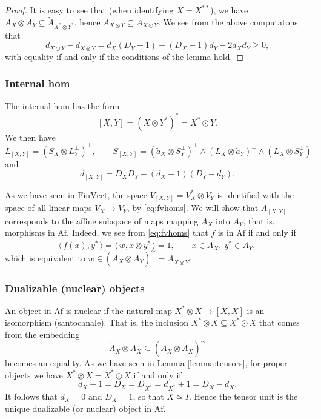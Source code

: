 \documentclass[12pt]{article}
\theoremstyle{definition}
\theoremstyle{remark}
\def\<{\langle\,}
\def\>{\,\rangle}
\def \Af{\mathrm{Af}}
\def \FV{\mathrm{FinVect}}
\begin{document}
\begin{proof} It is easy to see that (when identifying $X=X^{**}$), we have $A_X\otimes
A_Y\subseteq \tilde A_{X^*\otimes  Y^*}$, hence $A_{X\otimes Y}\subseteq A_{X\odot Y}$. We see from the above computatons that
\[
d_{X\odot Y}-d_{X\otimes Y}=d_X(D_Y-1)+(D_X-1)d_Y-2d_Xd_Y\ge 0,
\]
with equality if and only if the conditions of the lemma hold.

\end{proof}


\subsubsection{Internal hom}

The internal hom has the form
\begin{equation}\label{eq:ihom}
[X,Y]=(X\otimes Y^*)^*=X^*\odot Y.
\end{equation}
We then have 
\[
L_{[X,Y]}=(S_X\otimes L_Y^\perp)^\perp,\qquad S_{[X,Y]}=(\tilde a_X\otimes
S_Y^\perp)^\perp\wedge(L_X\otimes \tilde a_Y)^\perp\wedge (L_X\otimes
S_Y^\perp)^\perp
\]
and
\[
d_{[X,Y]}=D_XD_Y-(d_X+1)(D_Y-d_Y).
\]


As we have seen in $\FV$, the space $V_{[X,Y]}=V_X^*\otimes V_Y$ is identified with the
space of all linear maps $V_X\to V_Y$, by \eqref{eq:fvhoms}. We will show that $A_{[X,Y]}$ corresponds to the
affine subspace of maps mapping $A_X$ into $A_Y$, that is, morphisms in $\Af$. Indeed, we see from \eqref{eq:fvhoms}
that $f$ is in $\Af$ if and only if 
\[
\<f(x),y^*\>=\<w,x\otimes y^*\>=1, \qquad x\in A_X,\ y^*\in \tilde A_Y,
\]
which is equivalent to $w\in (A_X\otimes \tilde A_Y)^\sim=\tilde A_{X\otimes Y^*}$. 

\subsubsection{Dualizable (nuclear) objects}

An object in $\Af$ is nuclear if the natural map $X^*\otimes X\to [X,X]$ is an isomorphism
(santocanale). That is, the inclusion $X^*\otimes X\subseteq X^*\odot X$ that comes from the embedding 
\[
\tilde A_X\otimes A_X\subseteq (A_X\otimes \tilde A_X)^\sim
\]
becomes an equality. As we have seen in Lemma \ref{lemma:tensors}, for proper objects we
have $X^*\otimes X=X^*\odot X$ if and only if
\[
d_X+1=D_X=D_{X^*}=d_{X^*}+1=D_X-d_X.
\]
It follows that $d_X=0$ and $D_X=1$, so that $X\simeq I$. Hence the tensor unit is the
unique dualizable (or nuclear) object in $\Af$.
\end{document}
